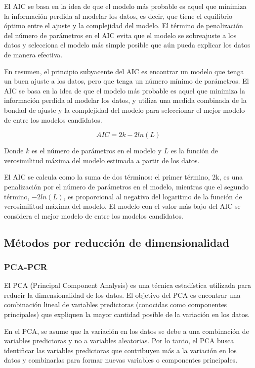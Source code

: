 \documentclass[
  letterpaper,
  DIV=11,
  numbers=noendperiod]{scrartcl}
\begin{document}
El AIC se basa en la idea de que el modelo más probable es aquel que
minimiza la información perdida al modelar los datos, es decir, que
tiene el equilibrio óptimo entre el ajuste y la complejidad del modelo.
El término de penalización del número de parámetros en el AIC evita que
el modelo se sobreajuste a los datos y selecciona el modelo más simple
posible que aún pueda explicar los datos de manera efectiva.

En resumen, el principio subyacente del AIC es encontrar un modelo que
tenga un buen ajuste a los datos, pero que tenga un número mínimo de
parámetros. El AIC se basa en la idea de que el modelo más probable es
aquel que minimiza la información perdida al modelar los datos, y
utiliza una medida combinada de la bondad de ajuste y la complejidad del
modelo para seleccionar el mejor modelo de entre los modelos candidatos.

\[
AIC=2k-2ln(L)
\]

Donde \(k\) es el número de parámetros en el modelo y \(L\) es la
función de verosimilitud máxima del modelo estimada a partir de los
datos.

El AIC se calcula como la suma de dos términos: el primer término, 2k,
es una penalización por el número de parámetros en el modelo, mientras
que el segundo término, \(-2ln(L)\), es proporcional al negativo del
logaritmo de la función de verosimilitud máxima del modelo. El modelo
con el valor más bajo del AIC se considera el mejor modelo de entre los
modelos candidatos.

\hypertarget{muxe9todos-por-reducciuxf3n-de-dimensionalidad}{%
\subsection{Métodos por reducción de
dimensionalidad}\label{muxe9todos-por-reducciuxf3n-de-dimensionalidad}}

\hypertarget{pca-pcr}{%
\subsubsection{PCA-PCR}\label{pca-pcr}}

El PCA (Principal Component Analysis) es una técnica estadística
utilizada para reducir la dimensionalidad de los datos. El objetivo del
PCA es encontrar una combinación lineal de variables predictoras
(conocidas como componentes principales) que expliquen la mayor cantidad
posible de la variación en los datos.

En el PCA, se asume que la variación en los datos se debe a una
combinación de variables predictoras y no a variables aleatorias. Por lo
tanto, el PCA busca identificar las variables predictoras que
contribuyen más a la variación en los datos y combinarlas para formar
nuevas variables o componentes principales.
\end{document}
